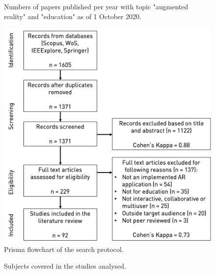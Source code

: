 \renewcommand{\floatpagefraction}{0.1}

\begin{figure}[t!]
	\begin{center}
	
	\caption{Numbers of papers published per year with topic "augmented reality" and "education" as of 1 October 2020.}
	\label{fig:pappublbg}
    \end{center}
\end{figure}

\clearpage
\newpage

\begin{figure}[t!]	
	\begin{center}
	\includegraphics[width=\textwidth]{figures/prisma.png}
	\caption{Prisma flowchart of the search protocol.}
	\label{fig:flowchart}
    \end{center}
\end{figure}

\clearpage
\newpage

\begin{figure}[t!]	
	\begin{center}
	
	\caption{Subjects covered in the studies analysed.}
	\label{fig:subjects}
    \end{center}
\end{figure}

